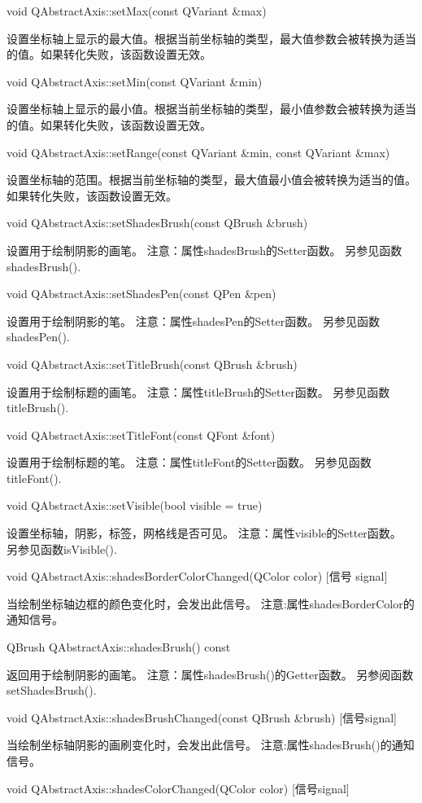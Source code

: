 void QAbstractAxis::setMax(const QVariant \&max) 

设置坐标轴上显示的最大值。根据当前坐标轴的类型，最大值参数会被转换为适当的值。如果转化失败，该函数设置无效。

void QAbstractAxis::setMin(const QVariant \&min) 

设置坐标轴上显示的最小值。根据当前坐标轴的类型，最小值参数会被转换为适当的值。如果转化失败，该函数设置无效。

void QAbstractAxis::setRange(const QVariant \&min, const QVariant
\&max) 

设置坐标轴的范围。根据当前坐标轴的类型，最大值最小值会被转换为适当的值。如果转化失败，该函数设置无效。

void QAbstractAxis::setShadesBrush(const QBrush \&brush)

 设置用于绘制阴影的画笔。 注意：属性shadesBrush的Setter函数。 另参见函数shadesBrush().

void QAbstractAxis::setShadesPen(const QPen \&pen)

 设置用于绘制阴影的笔。 注意：属性shadesPen的Setter函数。 另参见函数shadesPen().

void QAbstractAxis::setTitleBrush(const QBrush \&brush) 

设置用于绘制标题的画笔。 注意：属性titleBrush的Setter函数。 另参见函数titleBrush().

void QAbstractAxis::setTitleFont(const QFont \&font) 

设置用于绘制标题的笔。 注意：属性titleFont的Setter函数。 另参见函数titleFont().

void QAbstractAxis::setVisible(bool visible = true) 

设置坐标轴，阴影，标签，网格线是否可见。 注意：属性visible的Setter函数。 另参见函数isVisible().

void QAbstractAxis::shadesBorderColorChanged(QColor color) [信号
signal] 

当绘制坐标轴边框的颜色变化时，会发出此信号。 注意:属性shadesBorderColor的通知信号。

QBrush QAbstractAxis::shadesBrush() const 

返回用于绘制阴影的画笔。 注意：属性shadesBrush()的Getter函数。 另参阅函数setShadesBrush().

void QAbstractAxis::shadesBrushChanged(const QBrush \&brush) [信号signal] 

当绘制坐标轴阴影的画刷变化时，会发出此信号。 注意:属性shadesBrush()的通知信号。

void QAbstractAxis::shadesColorChanged(QColor color) [信号signal] 

